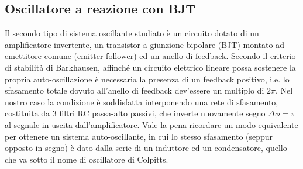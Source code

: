 \documentclass{article}[a4paper, oneside, 11pt]
\begin{document}
\subsection{Oscillatore a reazione con BJT}
Il secondo tipo di sistema oscillante studiato è un circuito dotato di
un amplificatore invertente, un transistor a giunzione bipolare (BJT) montato
ad emettitore comune (emitter-follower) ed un anello di feedback.
Secondo il criterio di stabilità di Barkhausen, affinché un circuito
elettrico lineare possa sostenere la propria auto-oscillazione è necessaria
la presenza di un feedback positivo, i.e. lo sfasamento totale dovuto
all'anello di feedback dev'essere un multiplo di $2\pi$. Nel nostro caso la
condizione è soddisfatta interponendo una rete di sfasamento, costituita da
3 filtri RC passa-alto passivi, che inverte nuovamente segno
$\Delta \phi = \pi$
al segnale in uscita dall'amplificatore. Vale la pena ricordare un
modo equivalente per ottenere un sistema auto-oscillante, in cui lo stesso
sfasamento (seppur opposto in segno) è dato dalla serie di un induttore ed
un condensatore, quello che va sotto il nome di oscillatore di Colpitts.
\end{document}

